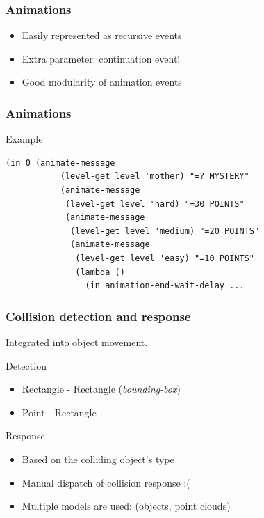 \documentclass{beamer}
\newcommand{\<}[1]{\`#1}
\begin{document}
\begin{frame}
  \frametitle{Animations}
  \begin{itemize}
  \item Easily represented as recursive events
  \item Extra parameter: \alert{continuation} event!
  \item Good modularity of animation events
  \end{itemize}
\end{frame}

\begin{frame}[fragile]
  \frametitle{Animations}
  \begin{block}{Example}
    \begin{lstlisting}[basicstyle=\footnotesize]
(in 0 (animate-message
           (level-get level 'mother) "=? MYSTERY"
           (animate-message
            (level-get level 'hard) "=30 POINTS"
            (animate-message
             (level-get level 'medium) "=20 POINTS"
             (animate-message
              (level-get level 'easy) "=10 POINTS"
              (lambda ()
                (in animation-end-wait-delay ...
    \end{lstlisting}
  \end{block}
\end{frame}

\begin{frame}
  \frametitle{Collision detection and response}

  Integrated into object movement.

  \begin{block}{Detection}
    \begin{itemize}
    \item Rectangle - Rectangle (\textit{bounding-box})
    \item Point - Rectangle
    \end{itemize}
  \end{block}

  \begin{block}{Response}
    \begin{itemize}
    \item Based on the colliding object's \alert{type}
    \item Manual dispatch of collision response :(
    \item Multiple models are used: (objects, point clouds)
    \end{itemize}
  \end{block}
\end{frame}
\end{document}
